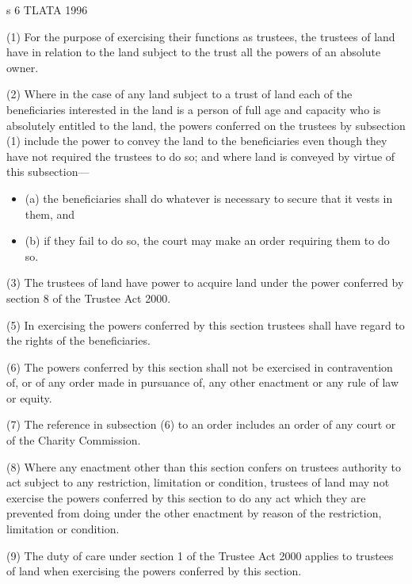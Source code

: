 \documentclass[
]{article}
\newenvironment{env-9843ce55-0506-497d-95ba-03a690b05b3c}
{
    \savenotes\tcolorbox[blanker,breakable,left=5pt,borderline west={2pt}{-4pt}{green}]
}
{
    \endtcolorbox\spewnotes
}
\begin{document}
\begin{env-9843ce55-0506-497d-95ba-03a690b05b3c}

s 6 TLATA 1996

(1) For the purpose of exercising their functions as trustees, the
trustees of land have in relation to the land subject to the trust all
the powers of an absolute owner.

(2) Where in the case of any land subject to a trust of land each of the
beneficiaries interested in the land is a person of full age and
capacity who is absolutely entitled to the land, the powers conferred on
the trustees by subsection (1) include the power to convey the land to
the beneficiaries even though they have not required the trustees to do
so; and where land is conveyed by virtue of this subsection---

\begin{itemize}
\item
  (a) the beneficiaries shall do whatever is necessary to secure that it
  vests in them, and
\item
  (b) if they fail to do so, the court may make an order requiring them
  to do so.
\end{itemize}

(3) The trustees of land have power to acquire land under the power
conferred by section 8 of the Trustee Act 2000.

(5) In exercising the powers conferred by this section trustees shall
have regard to the rights of the beneficiaries.

(6) The powers conferred by this section shall not be exercised in
contravention of, or of any order made in pursuance of, any other
enactment or any rule of law or equity.

(7) The reference in subsection (6) to an order includes an order of any
court or of the Charity Commission.

(8) Where any enactment other than this section confers on trustees
authority to act subject to any restriction, limitation or condition,
trustees of land may not exercise the powers conferred by this section
to do any act which they are prevented from doing under the other
enactment by reason of the restriction, limitation or condition.

(9) The duty of care under section 1 of the Trustee Act 2000 applies to
trustees of land when exercising the powers conferred by this section.

\end{env-9843ce55-0506-497d-95ba-03a690b05b3c}
\end{document}
